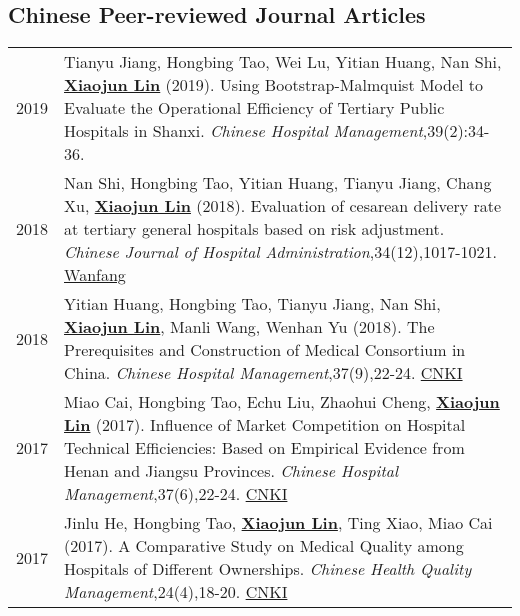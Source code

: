 \documentclass[a4paper,10pt]{article}
\begin{document}
\subsection*{Chinese Peer-reviewed Journal Articles}
\begin{longtable}{r p{13cm}}

2019 & Tianyu Jiang, Hongbing Tao, Wei Lu, Yitian Huang, Nan Shi, \underline{\textbf{Xiaojun Lin}} (2019). Using Bootstrap-Malmquist Model to Evaluate the Operational Efficiency of Tertiary Public Hospitals in Shanxi.  \emph{Chinese Hospital Management},39(2):34-36. \\[5pt]

2018 & Nan Shi, Hongbing Tao, Yitian Huang, Tianyu Jiang, Chang Xu, \underline{\textbf{Xiaojun Lin}} (2018). Evaluation of cesarean delivery rate at tertiary general hospitals based on risk adjustment. \emph{Chinese Journal of Hospital Administration},34(12),1017-1021. \href{http://www.wanfangdata.com.cn/details/detail.do?_type=perio&id=zhyygl201812011}{Wanfang} \\[5pt]

2018 & Yitian Huang, Hongbing Tao, Tianyu Jiang, Nan Shi, \underline{\textbf{Xiaojun Lin}}, Manli Wang, Wenhan Yu (2018). The Prerequisites and Construction of Medical Consortium in China. \emph{Chinese Hospital Management},37(9),22-24. \href{http://kns.cnki.net/KCMS/detail/detail.aspx?dbcode=CJFQ&dbname=CJFDLAST2018&filename=YYGL201809005&v=MjIxMjdlWnVadEZpRGxWNzNPUERUTVlyRzRIOW5NcG85RllZUjhlWDFMdXhZUzdEaDFUM3FUcldNMUZyQ1VSTEs=}{CNKI} \\[5pt]

2017 & Miao Cai, Hongbing Tao, Echu Liu, Zhaohui Cheng, \underline{\textbf{Xiaojun Lin}} (2017). Influence of Market Competition on Hospital Technical Efficiencies: Based on Empirical Evidence from Henan and Jiangsu Provinces. \emph{Chinese Hospital Management},37(6),22-24. \href{http://kns.cnki.net/KCMS/detail/detail.aspx?dbcode=CJFQ&dbname=CJFDLAST2017&filename=YYGL201706012&v=MzEzMTREbFZMdkFQRFRNWXJHNEg5Yk1xWTlFWm9SOGVYMUx1eFlTN0RoMVQzcVRyV00xRnJDVVJMS2VadVp0Rmk=}{CNKI}\\[5pt]

2017 & Jinlu He, Hongbing Tao, \underline{\textbf{Xiaojun Lin}}, Ting Xiao, Miao Cai (2017). A Comparative Study on Medical Quality among Hospitals of Different Ownerships. \emph{Chinese Health Quality Management},24(4),18-20. \href{http://kns.cnki.net/KCMS/detail/detail.aspx?dbcode=CJFQ&dbname=CJFDLAST2017&filename=WSJG201704010&v=MTU5NzM0OUVaSVI4ZVgxTHV4WVM3RGgxVDNxVHJXTTFGckNVUkxLZVp1WnRGaURtVTcvTU1qN0JhYkc0SDliTXE=}{CNKI}\\[5pt]


\end{longtable}
\end{document}
